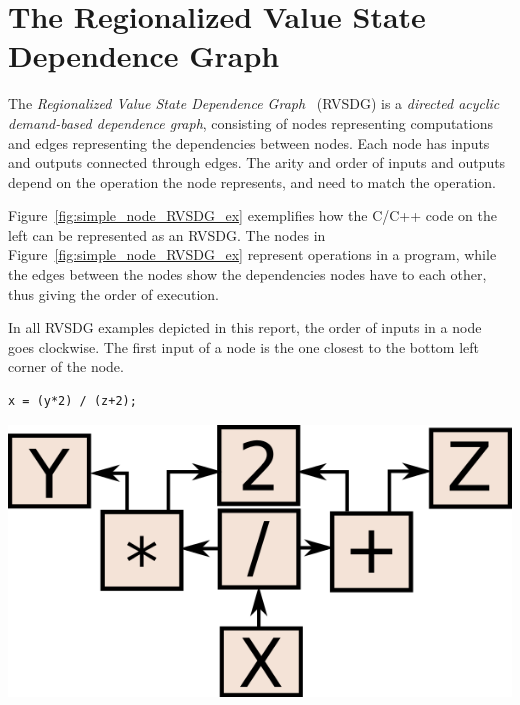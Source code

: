 
\clearpage
\section{The Regionalized Value State Dependence Graph}
\label{background:RVSDG}

The \textit{Regionalized Value State Dependence Graph}~\cite{RVSDG:HiPEACpaper}
(RVSDG) is a \textit{directed acyclic demand-based dependence graph},
consisting of nodes representing computations and edges representing the
dependencies between nodes. Each node has inputs and outputs connected through
edges. The arity and order of inputs and outputs depend on the operation the
node represents, and need to match the operation.

Figure~\ref{fig:simple_node_RVSDG_ex} exemplifies how the C/C++ code on the left
can be represented as an RVSDG. The nodes in
Figure~\ref{fig:simple_node_RVSDG_ex} represent operations in a program, while
the edges between the nodes show the dependencies nodes have to each other, thus
giving the order of execution.

In all RVSDG examples depicted in this report, the order of inputs in a node
goes clockwise. The first input of a node is the one closest to the bottom left
corner of the node.

\begin{centering}
	\noindent\begin{minipage}{0.36\textwidth}
		\begin{CenteredBox}
		\begin{lstlisting}[label={lst:simple_node_RVSDG_ex},
style=minipage_customcpp, basicstyle=\fontsize{10}{1}]
x = (y*2) / (z+2);
		\end{lstlisting}
		\end{CenteredBox}
	\end{minipage}
	\noindent\begin{minipage}{0.55\textwidth}
		\captionsetup{type=figure}
		\includegraphics[width=\textwidth]{figures/svg/simple_node_RVSDG_ex}
	\end{minipage}
	\label{fig:simple_node_RVSDG_ex}
\end{centering}

